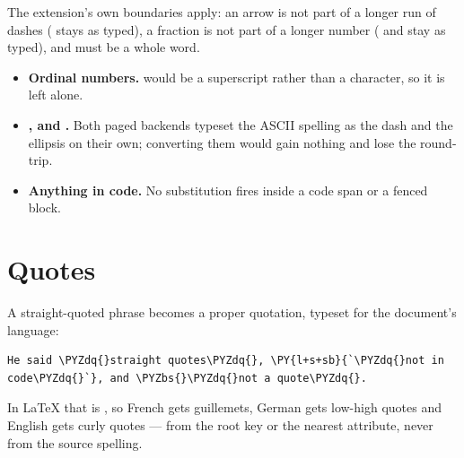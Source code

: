 \documentclass[a4paper,twoside]{article}
\begin{document}
The extension's own boundaries apply: an arrow is not part of a longer run of
dashes (\tscodeinline{-\allowbreak{}-\allowbreak{}-\allowbreak{}>} stays as typed), a fraction is not part of a longer number
( and  stay as typed), and  must be a whole word.
\begin{tscallout}[kind=note, title={What is \emph{not} substituted}]
\begin{itemize}
\item \textbf{Ordinal numbers.}  would be a superscript rather than a
character, so it is left alone.
\item \textbf{\tscodeinline{-\allowbreak{}-\allowbreak{}}, \tscodeinline{-\allowbreak{}-\allowbreak{}-\allowbreak{}} and .} Both paged backends typeset the ASCII
spelling as the dash and the ellipsis on their own; converting them would
gain nothing and lose the round-trip.
\item \textbf{Anything in code.} No substitution fires inside a code span or a
fenced block.
\end{itemize}
\end{tscallout}
\section{Quotes}
A straight-quoted phrase becomes a proper quotation, typeset for the document's
language:
\begin{tscode}[lang=md, engine=pygments]
\begin{Verbatim}[commandchars=\\\{\},breaklines, breakanywhere, commandchars=\\\{\}]
He said \PYZdq{}straight quotes\PYZdq{}, \PY{l+s+sb}{`\PYZdq{}not in code\PYZdq{}`}, and \PYZbs{}\PYZdq{}not a quote\PYZdq{}.
\end{Verbatim}
\end{tscode}
In \LaTeX{} that is , so French gets guillemets, German
gets low-high quotes and English gets curly quotes --- from the root  key
or the nearest  attribute, never from the source spelling.
\end{document}
